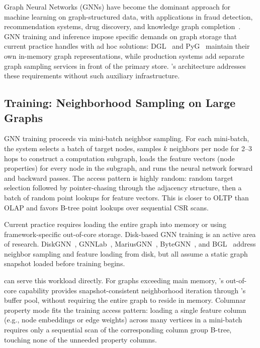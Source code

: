 Graph Neural Networks (GNNs) have become the dominant approach for machine learning on graph-structured data, with applications in fraud detection, recommendation systems, drug discovery, and knowledge graph completion~\cite{hamilton2017graphsage, velivckovic2017gat, kipf2016gcn}.
GNN training and inference impose specific demands on graph storage that current practice handles with ad hoc solutions: DGL~\cite{wang2019dgl} and PyG~\cite{fey2019pyg} maintain their own in-memory graph representations, while production systems add separate graph sampling services in front of the primary store.
\project{}'s architecture addresses these requirements without such auxiliary infrastructure.

\subsection{Training: Neighborhood Sampling on Large Graphs}
\label{sec:future:gnn:training}

GNN training proceeds via mini-batch neighbor sampling.
For each mini-batch, the system selects a batch of target nodes, samples $k$ neighbors per node for 2--3 hops to construct a computation subgraph, loads the feature vectors (node properties) for every node in the subgraph, and runs the neural network forward and backward passes.
The access pattern is highly random: random target selection followed by pointer-chasing through the adjacency structure, then a batch of random point lookups for feature vectors.
This is closer to OLTP than OLAP and favors B-tree point lookups over sequential CSR scans.

Current practice requires loading the entire graph into memory or using framework-specific out-of-core storage.
Disk-based GNN training is an active area of research.
DiskGNN~\cite{Liu2025DiskGNN}, GNNLab~\cite{Yang2022GNNLab}, MariusGNN~\cite{Waleffe2023MariusGNN}, ByteGNN~\cite{Zheng2022ByteGNN}, and BGL~\cite{liu2023bgl} address neighbor sampling and feature loading from disk, but all assume a static graph snapshot loaded before training begins.

\project{} can serve this workload directly.
For graphs exceeding main memory, \project{}'s out-of-core capability provides snapshot-consistent neighborhood iteration through \wt{}'s buffer pool, without requiring the entire graph to reside in memory.
Columnar property mode fits the training access pattern: loading a single feature column (e.g., node embeddings or edge weights) across many vertices in a mini-batch requires only a sequential scan of the corresponding column group B-tree, touching none of the unneeded property columns.

